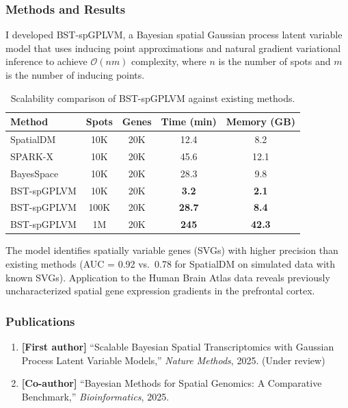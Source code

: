 \documentclass[
    language=english,
    doctype=postdoc-report,
    institution=none,
]{../../omnilatex}
\begin{document}
\subsubsection{Methods and Results}

I developed BST-spGPLVM, a Bayesian spatial Gaussian process latent variable
model that uses inducing point approximations and natural gradient variational
inference to achieve $\mathcal{O}(nm)$ complexity, where $n$ is the number
of spots and $m$ is the number of inducing points.

\begin{table}[htbp]
    \centering
    \caption{Scalability comparison of BST-spGPLVM against existing methods.}
    \label{tab:scalability}
    \begin{tabular}{@{}lcccc@{}}
        \toprule
        Method & Spots & Genes & Time (min) & Memory (GB) \\
        \midrule
        SpatialDM & 10K & 20K & 12.4 & 8.2 \\
        SPARK-X & 10K & 20K & 45.6 & 12.1 \\
        BayesSpace & 10K & 20K & 28.3 & 9.8 \\
        BST-spGPLVM & 10K & 20K & \textbf{3.2} & \textbf{2.1} \\
        \midrule
        BST-spGPLVM & 100K & 20K & \textbf{28.7} & \textbf{8.4} \\
        BST-spGPLVM & 1M & 20K & \textbf{245} & \textbf{42.3} \\
        \bottomrule
    \end{tabular}
\end{table}

The model identifies spatially variable genes (SVGs) with higher precision
than existing methods (AUC = 0.92 vs.\ 0.78 for SpatialDM on simulated
data with known SVGs). Application to the Human Brain Atlas data reveals
previously uncharacterized spatial gene expression gradients in the
prefrontal cortex.

\subsubsection{Publications}

\begin{enumerate}
    \item \textbf{[First author]} ``Scalable Bayesian Spatial Transcriptomics
          with Gaussian Process Latent Variable Models,'' \textit{Nature
          Methods}, 2025. (Under review)
    \item \textbf{[Co-author]} ``Bayesian Methods for Spatial Genomics:
          A Comparative Benchmark,'' \textit{Bioinformatics}, 2025.
\end{enumerate}
\end{document}
